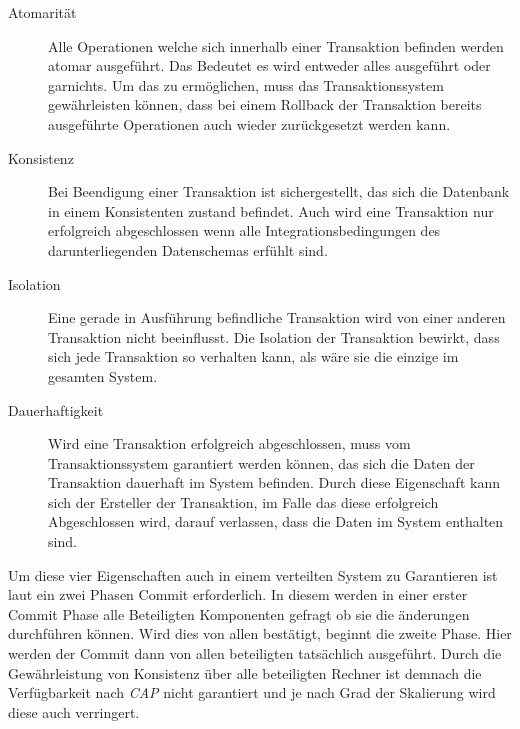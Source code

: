 \begin{description}
    \item[Atomarität] Alle Operationen welche sich innerhalb einer Transaktion befinden werden atomar ausgeführt. Das Bedeutet es wird entweder alles ausgeführt oder garnichts. Um das zu ermöglichen, muss das Transaktionssystem gewährleisten können, dass bei einem Rollback der Transaktion bereits ausgeführte Operationen auch wieder zurückgesetzt werden kann. 
    \item[Konsistenz] Bei Beendigung einer Transaktion ist sichergestellt, das sich die Datenbank in einem Konsistenten zustand befindet. Auch wird eine Transaktion nur erfolgreich abgeschlossen wenn alle Integrationsbedingungen des darunterliegenden Datenschemas erfühlt sind. 
    \item[Isolation] Eine gerade in Ausführung befindliche Transaktion wird von einer anderen Transaktion nicht beeinflusst. Die Isolation der Transaktion bewirkt, dass sich jede Transaktion so verhalten kann, als wäre sie die einzige im gesamten System.
    \item[Dauerhaftigkeit] Wird eine Transaktion erfolgreich abgeschlossen, muss vom Transaktionssystem garantiert werden können, das sich die Daten der Transaktion dauerhaft im System befinden. Durch diese Eigenschaft kann sich der Ersteller der Transaktion, im Falle das diese erfolgreich Abgeschlossen wird, darauf verlassen, dass die Daten im System enthalten sind.
\end{description}
Um diese vier Eigenschaften auch in einem verteilten System zu Garantieren ist laut \cite{PritchettBASE} ein zwei Phasen Commit erforderlich. In diesem werden in einer erster Commit Phase alle Beteiligten Komponenten gefragt ob sie die änderungen durchführen können. Wird dies von allen bestätigt, beginnt die zweite Phase. Hier werden der Commit dann von allen beteiligten tatsächlich ausgeführt. Durch die Gewährleistung von Konsistenz über alle beteiligten Rechner ist demnach die Verfügbarkeit nach \textit{CAP} nicht garantiert und je nach Grad der Skalierung wird diese auch verringert.

